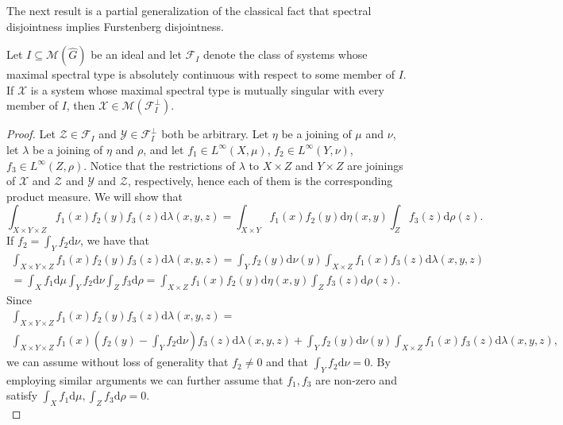 \documentclass[graybox]{svmult}
\theoremstyle{definition}
\begin{document}
The next result is a partial generalization of the classical fact that spectral disjointness implies Furstenberg disjointness.

\begin{theorem}\label{SpectralDisjointnessImpliesMultiplier}
    Let $I \subseteq \mathcal{M}(\widehat{G})$ be an ideal and let $\mathcal{F}_I$ denote the class of systems whose maximal spectral type is absolutely continuous with respect to some member of $I$.
    If $\mathcal{X}$ is a system whose maximal spectral type is mutually singular with every member of $I$, then $\mathcal{X} \in \mathscr{M}(\mathcal{F}_I^\perp)$.
\end{theorem}
\begin{proof}
    Let $\mathcal{Z} \in \mathcal{F}_I$ and $\mathcal{Y} \in \mathcal{F}_I^\perp$ both be arbitrary.
    Let $\eta$ be a joining of $\mu$ and $\nu$, let $\lambda$ be a joining of $\eta$ and $\rho$, and let $f_1\in L^\infty(X,\mu)$, $f_2\in L^\infty(Y,\nu)$, $f_3\in L^\infty(Z,\rho)$.
    Notice that the restrictions of $\lambda$ to $X\times Z$ and $Y\times Z$ are joinings of $\mathcal X$ and $\mathcal Z$ and $\mathcal Y$ and $\mathcal Z$, respectively, hence each of them is the corresponding product measure. 
    We will show that 
    \begin{equation*}
    \int_{X\times Y\times Z}f_1(x)f_2(y)f_3(z)\text{d}\lambda(x,y,z)=\int_{X\times Y}f_1(x)f_2(y)\text{d}\eta(x,y)\int_Zf_3(z)\text{d}\rho(z).
    \end{equation*} 
    If $f_2=\int_Yf_2\text{d}\nu$, we have that
    \begin{multline*}
    \int_{X\times Y\times Z}f_1(x)f_2(y)f_3(z)\text{d}\lambda(x,y,z)=\int_Y f_2(y)\text{d}\nu(y)\int_{X\times Z}f_1(x)f_3(z)\text{d}\lambda(x,y,z)\\
    =\int_X f_1\text{d}\mu\int_Yf_2\text{d}\nu\int_Zf_3\text{d}\rho=\int_{X\times Z}f_1(x)f_2(y)\text{d}\eta(x,y)\int_Zf_3(z)\text{d}\rho(z).
    \end{multline*}
Since
\begin{multline*}
\int_{X\times Y\times Z}f_1(x)f_2(y)f_3(z)\text{d}\lambda(x,y,z)=\\
\int_{X\times Y\times Z}f_1(x)\left(f_2(y)-\int_Yf_2\text{d}\nu\right)f_3(z)\text{d}\lambda(x,y,z)+\int_Y f_2(y)\text{d}\nu(y)\int_{X\times Z}f_1(x)f_3(z)\text{d}\lambda(x,y,z),
\end{multline*}
we can assume without loss of generality that $f_2\neq 0$ and that  $\int_Y f_2\text{d}\nu=0$.
By employing similar arguments we can further assume that $f_1,f_3$ are non-zero and satisfy $\int_X f_1\text{d}\mu,\int_Zf_3\text{d}\rho=0$.\\

\end{proof}
\end{document}
